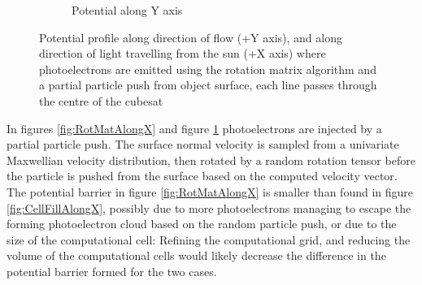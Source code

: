 \begin{figure}[H]
\begin{subfigure}[b]{0.6\textwidth}
    \caption{Potential along Y axis}
    \label{fig:RotMatAlongY}
  \end{subfigure}
  \label{fig:RotMatAlong}
  \caption{Potential profile along direction of flow (+Y axis), and along direction of light travelling from the sun (+X axis) where photoelectrons are emitted using the rotation matrix algorithm and a partial particle push from object surface, each line passes through the centre of the cubesat}
\end{figure}

\raggedbottom


In figures \ref{fig:RotMatAlongX} and figure \ref{fig:RotMatAlongY} photoelectrons are injected by a partial particle push. The surface normal velocity is sampled from a univariate Maxwellian velocity distribution, then rotated by a random rotation tensor before the particle is pushed from the surface based on the computed velocity vector. The potential barrier in figure \ref{fig:RotMatAlongX} is smaller than found in figure \ref{fig:CellFillAlongX}, possibly due to more photoelectrons managing to escape the forming photoelectron cloud based on the random particle push, or due to the size of the computational cell: Refining the computational grid, and reducing the volume of the computational cells would likely decrease the difference in the potential barrier formed for the two cases. 


